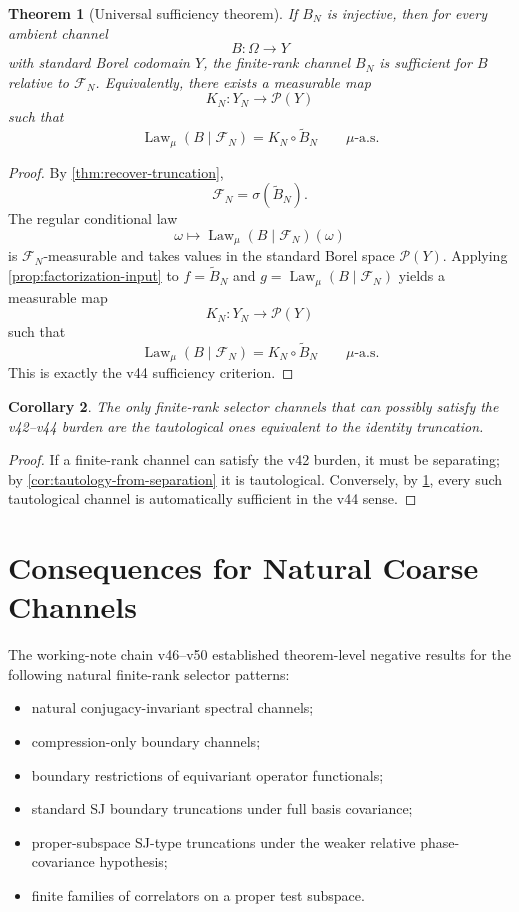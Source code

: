 \documentclass[11pt,a4paper]{article}
\newtheorem{theorem}{Theorem}[section]
\newtheorem{corollary}[theorem]{Corollary}
\theoremstyle{definition}
\theoremstyle{remark}
\newcommand{\cF}{\mathcal F}
\newcommand{\cP}{\mathcal P}
\newcommand{\Law}{\operatorname{Law}}
\begin{document}
\begin{theorem}[Universal sufficiency theorem]
\label{thm:universal-sufficiency}
If $B_N$ is injective, then for every ambient channel
\[
B:\Omega\to Y
\]
with standard Borel codomain $Y$, the finite-rank channel $B_N$ is
sufficient for $B$ relative to $\cF_N$.  Equivalently, there exists a
measurable map
\[
K_N:Y_N\to \cP(Y)
\]
such that
\[
\Law_\mu(B\mid \cF_N)
=
K_N\circ \widetilde B_N
\qquad
\mu\text{-a.s.}
\]
\end{theorem}

\begin{proof}
By \cref{thm:recover-truncation},
\[
\cF_N=\sigma(\widetilde B_N).
\]
The regular conditional law
\[
\omega\mapsto \Law_\mu(B\mid \cF_N)(\omega)
\]
is $\cF_N$-measurable and takes values in the standard Borel space
$\cP(Y)$.  Applying \cref{prop:factorization-input} to
$f=\widetilde B_N$ and
$g=\Law_\mu(B\mid \cF_N)$ yields a measurable map
\[
K_N:Y_N\to \cP(Y)
\]
such that
\[
\Law_\mu(B\mid \cF_N)=K_N\circ \widetilde B_N
\qquad
\mu\text{-a.s.}
\]
This is exactly the v44 sufficiency criterion.
\end{proof}

\begin{corollary}
\label{cor:only-tautological-survive}
The only finite-rank selector channels that can possibly satisfy the
v42--v44 burden are the tautological ones equivalent to the identity
truncation.
\end{corollary}

\begin{proof}
If a finite-rank channel can satisfy the v42 burden, it must be
separating; by \cref{cor:tautology-from-separation} it is tautological.
Conversely, by \cref{thm:universal-sufficiency}, every such tautological
channel is automatically sufficient in the v44 sense.
\end{proof}

\section{Consequences for Natural Coarse Channels}

The working-note chain v46--v50 established theorem-level negative
results for the following natural finite-rank selector patterns:

\begin{itemize}[leftmargin=2em]
  \item natural conjugacy-invariant spectral channels;
  \item compression-only boundary channels;
  \item boundary restrictions of equivariant operator functionals;
  \item standard SJ boundary truncations under full basis covariance;
  \item proper-subspace SJ-type truncations under the weaker relative
        phase-covariance hypothesis;
  \item finite families of correlators on a proper test subspace.
\end{itemize}
\end{document}
